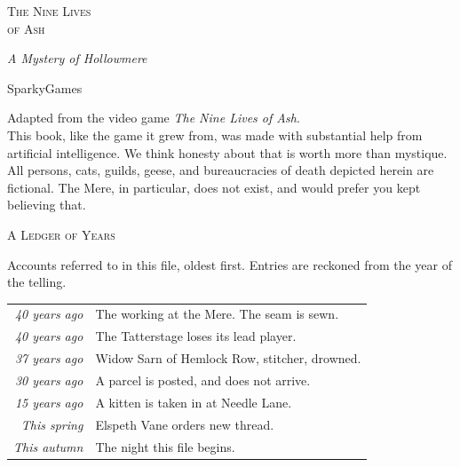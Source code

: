 \documentclass[11pt,twoside]{book}
\begin{document}
\frontmatter

\begin{titlepage}
  \centering
  \vspace*{1.6in}
  {\Huge\scshape The Nine Lives\\[0.35em] of Ash\par}
  \vspace{0.6in}
  {\large\itshape A Mystery of Hollowmere\par}
  \vfill
  {\large SparkyGames\par}
  \vspace{0.8in}
\end{titlepage}

\thispagestyle{empty}
\vspace*{\fill}
\begin{center}
\begin{minipage}{0.85\textwidth}\centering\small
Adapted from the video game \emph{The Nine Lives of Ash}.\\[0.6em]
This book, like the game it grew from, was made with substantial help
from artificial intelligence. We think honesty about that is worth more
than mystique.\\[0.6em]
All persons, cats, guilds, geese, and bureaucracies of death depicted
herein are fictional. The Mere, in particular, does not exist, and
would prefer you kept believing that.
\end{minipage}
\end{center}
\vspace*{\fill}
\clearpage

\tableofcontents

\cleardoublepage
\thispagestyle{plain}
\vspace*{0.4in}
\begin{center}{\Large\scshape A Ledger of Years\par}\end{center}
\bigskip
\noindent Accounts referred to in this file, oldest first. Entries are
reckoned from the year of the telling.
\bigskip

\noindent\begin{tabular}{@{}rl@{}}
\emph{40 years ago} & The working at the Mere. The seam is sewn.\\[0.2em]
\emph{40 years ago} & The Tatterstage loses its lead player.\\[0.2em]
\emph{37 years ago} & Widow Sarn of Hemlock Row, stitcher, drowned.\\[0.2em]
\emph{30 years ago} & A parcel is posted, and does not arrive.\\[0.2em]
\emph{15 years ago} & A kitten is taken in at Needle Lane.\\[0.2em]
\emph{This spring} & Elspeth Vane orders new thread.\\[0.2em]
\emph{This autumn} & The night this file begins.\\
\end{tabular}
\end{document}
